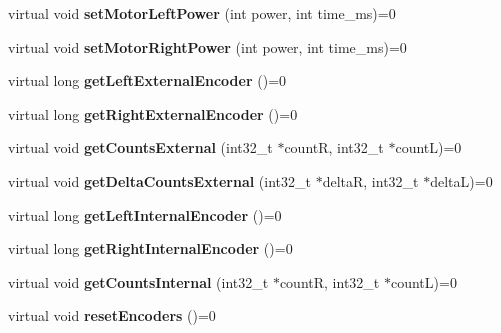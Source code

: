 \begin{DoxyCompactItemize}
\item 
\mbox{\label{classAAsservDriver_a67ed5e8b3460f9496f36662beab44a46}} 
virtual void {\bfseries set\+Motor\+Left\+Power} (int power, int time\+\_\+ms)=0
\item 
\mbox{\label{classAAsservDriver_a6cd9bf62cb78150f94d38fa978c0a83a}} 
virtual void {\bfseries set\+Motor\+Right\+Power} (int power, int time\+\_\+ms)=0
\item 
\mbox{\label{classAAsservDriver_ac30b15c18f0bf293cb322ae90a5bf7cc}} 
virtual long {\bfseries get\+Left\+External\+Encoder} ()=0
\item 
\mbox{\label{classAAsservDriver_a2799a875b5fc7975d6eeb0a3f98bc108}} 
virtual long {\bfseries get\+Right\+External\+Encoder} ()=0
\item 
\mbox{\label{classAAsservDriver_a733770d9a0eb73caa897baadd3e36f9d}} 
virtual void {\bfseries get\+Counts\+External} (int32\+\_\+t $\ast$countR, int32\+\_\+t $\ast$countL)=0
\item 
\mbox{\label{classAAsservDriver_ac303905f9004ca89964b7fd6c3b5df81}} 
virtual void {\bfseries get\+Delta\+Counts\+External} (int32\+\_\+t $\ast$deltaR, int32\+\_\+t $\ast$deltaL)=0
\item 
\mbox{\label{classAAsservDriver_a99137b00bcf944c7fe8280d4e6adf194}} 
virtual long {\bfseries get\+Left\+Internal\+Encoder} ()=0
\item 
\mbox{\label{classAAsservDriver_a474f74d48b64f813c6c7a3aa67bb5c07}} 
virtual long {\bfseries get\+Right\+Internal\+Encoder} ()=0
\item 
\mbox{\label{classAAsservDriver_aaa5418d791cab277447abf18afe31c4e}} 
virtual void {\bfseries get\+Counts\+Internal} (int32\+\_\+t $\ast$countR, int32\+\_\+t $\ast$countL)=0
\item 
\mbox{\label{classAAsservDriver_affe6c7f465c2f499a6f1e28ea2e7eb85}} 
virtual void {\bfseries reset\+Encoders} ()=0
\item 

\end{DoxyCompactItemize}
